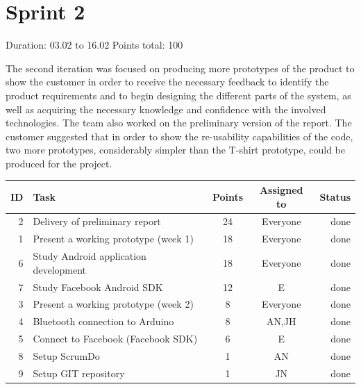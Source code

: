 \newpage


\section{Sprint 2}

Duration: 03.02 to 16.02
Points total: 100

The second iteration was focused on producing more prototypes of the product to
show the customer in order to receive the necessary feedback to identify
the product requirements and to begin designing the different parts of the
system, as well as acquiring the necessary knowledge and confidence with the
involved technologies. The team also worked on the preliminary version of the
report. The customer suggested that in order to show the re-usability
capabilities of the code, two more prototypes, considerably simpler than the
T-shirt prototype, could be produced for the project.

\begin{table}[ht!]
\begin{tabular}{ | r | l | c | c | r | }

\hline
\textbf{ID} & \textbf{Task} & \textbf{Points} & \textbf{Assigned to} &\textbf{Status} \\
\hline

 2 & Delivery of preliminary report				& 24 & Everyone		& done \\
\hline
 1 & Present a working prototype (week 1)		& 18 & Everyone		& done \\
\hline
 6 & Study Android application development		& 18 & Everyone		& done \\
\hline
 7 & Study Facebook Android SDK					& 12 & E			& done \\
\hline
 3 & Present a working prototype (week 2)		& 8  & Everyone		& done \\
\hline
 4 & Bluetooth connection to Arduino			& 8  & AN,JH		& done \\
\hline
 5 & Connect to Facebook (Facebook SDK)			& 6  & E			& done \\
\hline
 8 & Setup ScrumDo								& 1  & AN			& done \\
\hline
 9 & Setup GIT repository						& 1  & JN			& done \\
\hline

\end{tabular}
\end{table}

